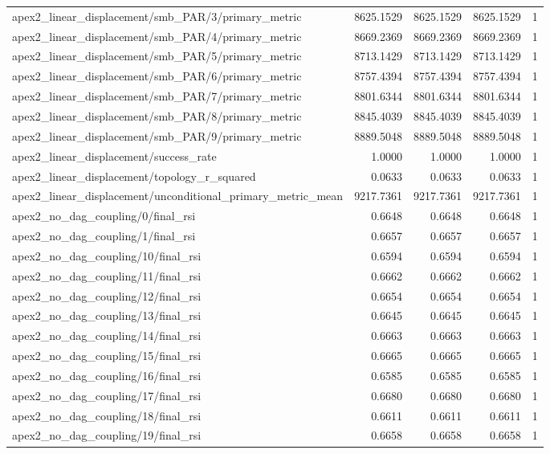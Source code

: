 \begin{table}[h]
\begin{tabular}{lrrrr}
apex2_linear_displacement/smb_PAR/3/primary_metric & 8625.1529 & 8625.1529 & 8625.1529 & 1 \\
apex2_linear_displacement/smb_PAR/4/primary_metric & 8669.2369 & 8669.2369 & 8669.2369 & 1 \\
apex2_linear_displacement/smb_PAR/5/primary_metric & 8713.1429 & 8713.1429 & 8713.1429 & 1 \\
apex2_linear_displacement/smb_PAR/6/primary_metric & 8757.4394 & 8757.4394 & 8757.4394 & 1 \\
apex2_linear_displacement/smb_PAR/7/primary_metric & 8801.6344 & 8801.6344 & 8801.6344 & 1 \\
apex2_linear_displacement/smb_PAR/8/primary_metric & 8845.4039 & 8845.4039 & 8845.4039 & 1 \\
apex2_linear_displacement/smb_PAR/9/primary_metric & 8889.5048 & 8889.5048 & 8889.5048 & 1 \\
apex2_linear_displacement/success_rate & 1.0000 & 1.0000 & 1.0000 & 1 \\
apex2_linear_displacement/topology_r_squared & 0.0633 & 0.0633 & 0.0633 & 1 \\
apex2_linear_displacement/unconditional_primary_metric_mean & 9217.7361 & 9217.7361 & 9217.7361 & 1 \\
apex2_no_dag_coupling/0/final_rsi & 0.6648 & 0.6648 & 0.6648 & 1 \\
apex2_no_dag_coupling/1/final_rsi & 0.6657 & 0.6657 & 0.6657 & 1 \\
apex2_no_dag_coupling/10/final_rsi & 0.6594 & 0.6594 & 0.6594 & 1 \\
apex2_no_dag_coupling/11/final_rsi & 0.6662 & 0.6662 & 0.6662 & 1 \\
apex2_no_dag_coupling/12/final_rsi & 0.6654 & 0.6654 & 0.6654 & 1 \\
apex2_no_dag_coupling/13/final_rsi & 0.6645 & 0.6645 & 0.6645 & 1 \\
apex2_no_dag_coupling/14/final_rsi & 0.6663 & 0.6663 & 0.6663 & 1 \\
apex2_no_dag_coupling/15/final_rsi & 0.6665 & 0.6665 & 0.6665 & 1 \\
apex2_no_dag_coupling/16/final_rsi & 0.6585 & 0.6585 & 0.6585 & 1 \\
apex2_no_dag_coupling/17/final_rsi & 0.6680 & 0.6680 & 0.6680 & 1 \\
apex2_no_dag_coupling/18/final_rsi & 0.6611 & 0.6611 & 0.6611 & 1 \\
apex2_no_dag_coupling/19/final_rsi & 0.6658 & 0.6658 & 0.6658 & 1 \\

\end{tabular}
\end{table}
